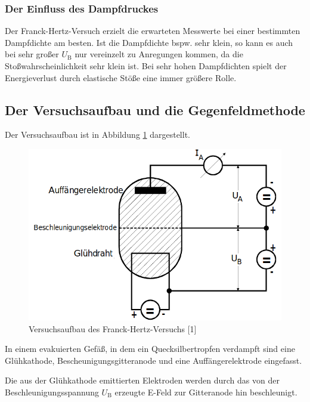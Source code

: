 \subsubsection{Der Einfluss des Dampfdruckes}

Der Franck-Hertz-Versuch erzielt die erwarteten Messwerte bei einer bestimmten Dampfdichte am besten.
Ist die Dampfdichte bspw. sehr klein, so kann es auch bei sehr großer $U_\text{B}$ nur vereinzelt
zu Anregungen kommen, da die Stoßwahrscheinlichkeit sehr klein ist. Bei sehr hohen Dampfdichten 
spielt der Energieverlust durch elastische Stöße eine immer größere Rolle.



\subsection{Der Versuchsaufbau und die Gegenfeldmethode}

Der Versuchsaufbau ist in Abbildung \ref{fig:bild1} dargestellt.

\begin{figure} [H]
    \centering
    \includegraphics[scale=0.4]{content/bild1.png}
    \caption{Versuchsaufbau des Franck-Hertz-Versuchs [1]}
    \label{fig:bild1}
  \end{figure}

In einem evakuierten Gefäß, in dem ein Quecksilbertropfen verdampft sind
eine Glühkathode, Bescheunigungsgitteranode und eine Auffängerelektrode eingefasst.

Die aus der Glühkathode emittierten Elektroden werden durch das von der
Beschleunigungsspannung $U_\text{B}$ erzeugte E-Feld zur Gitteranode hin
beschleunigt.

